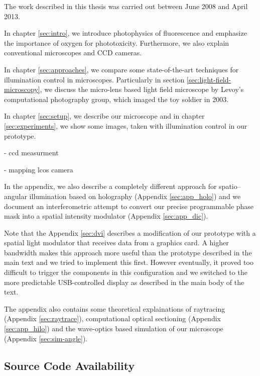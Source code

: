 \documentclass[oneside,a4paper,12pt,BCOR20mm,DIV14]{scrbook} %
\begin{document}
The work described in this thesis was carried out between June 2008
and April 2013.

In chapter \ref{sec:intro}, we introduce photophysics of fluorescence
and emphasize the importance of oxygen for phototoxicity. Furthermore,
we also explain conventional microscopes and CCD cameras.

In chapter \ref{sec:approaches}, we compare some state-of-the-art
techniques for illumination control in microscopes.  Particularly in
section \ref{sec:light-field-microscopy}, we discuss the micro-lens
based light field microscope by Levoy's computational photography
group, which imaged the toy soldier in 2003.

In chapter \ref{sec:setup}, we describe our microscope and in chapter
\ref{sec:experiments}, we show some images, taken with illumination
control in our prototype.

- ccd measurment

- mapping lcos camera

In the appendix, we also describe a completely different approach for
spatio--angular illumination based on holography (Appendix
\ref{sec:app_holo}) and we document an interferometric attempt to
convert our precise programmable phase mask into a spatial intensity
modulator (Appendix \ref{sec:app_dic}).

Note that the Appendix \ref{sec:dvi} describes a modification of our
prototype with a spatial light modulator that receives data from a
graphics card. A higher bandwidth makes this approach more useful than
the prototype described in the main text and we tried to implement
this first. However eventually, it proved too difficult to trigger the
components in this configuration and we switched to the more
predictable USB-controlled display as described in the main body of
the text.
 
The appendix also contains some theoretical explainations of
raytracing (Appendix \ref{sec:raytrace}), computational optical
sectioning (Appendix \ref{sec:app_hilo}) and the wave-optics based
simulation of our microscope (Appendix \ref{sec:sim-angle}).

\subsection*{Source Code Availability}
\end{document}
